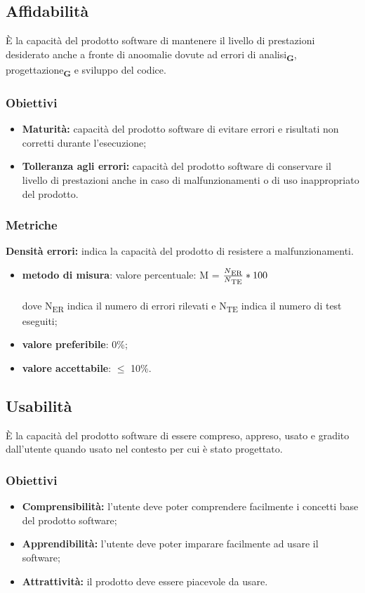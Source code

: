 \subsection{Affidabilità}
È la capacità del prodotto software di mantenere il livello di prestazioni
desiderato anche a fronte di anoomalie dovute ad errori di analisi\textsubscript{\textbf{G}}, progettazione\textsubscript{\textbf{G}} e sviluppo del codice.
\subsubsection{Obiettivi}
\begin{itemize}
    \item \textbf{Maturità:} capacità del prodotto software di evitare errori e risultati non corretti durante l’esecuzione;
    \item \textbf{Tolleranza agli errori:} capacità del prodotto software di conservare il livello di prestazioni 
    anche in caso di malfunzionamenti o di uso inappropriato del prodotto.
\end{itemize}
\subsubsection{Metriche}
\textbf{Densità errori:} indica la capacità del prodotto di resistere a malfunzionamenti.
\begin{itemize}
    \item \textbf{metodo di misura}: valore percentuale: M = $\frac{N\textsubscript{ER}}{N\textsubscript{TE}}*100$ \\
    \\dove N\textsubscript{ER} indica il numero di errori rilevati e N\textsubscript{TE} indica il numero di test eseguiti;
    \item \textbf{valore preferibile}: 0\%;
    \item \textbf{valore accettabile}: $\leq$ 10\%.
\end{itemize}
\subsection{Usabilità}
È la capacità del prodotto software di essere compreso, appreso, usato e gradito dall’utente quando usato nel contesto per cui è stato progettato.
\subsubsection{Obiettivi}
\begin{itemize}
    \item \textbf{Comprensibilità:} l'utente deve poter comprendere facilmente i concetti base del prodotto software;
    \item \textbf{Apprendibilità:} l'utente deve poter imparare facilmente ad usare il software;
    \item \textbf{Attrattività:} il prodotto deve essere piacevole da usare.
\end{itemize}
